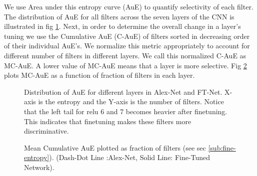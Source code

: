 We use Area under this entropy curve (AuE) to quantify selectivity of each filter. The distribution of AuE for all filters across the seven layers of the CNN is illustrated in fig \ref{fig:fine-hist}. Next, in order to determine the overall change in a layer's tuning we use the Cumulative AuE (C-AuE) of filters sorted in decreasing order of their individual AuE's. We normalize this metric appropriately to account for different number of filters in different layers. We call this normalized C-AuE as MC-AuE. A lower value of MC-AuE means that a layer is more selective.  Fig \ref{fig:fine-entropy} plots MC-AuE as a function of fraction of filters in each layer. 

\begin{figure}[t!]
\centering
{}
\caption{Distribution of AuE for different layers in Alex-Net and FT-Net. X-axis is the entropy and the Y-axis is the number of filters. Notice that the left tail for relu 6 and 7 becomes heavier after finetuning. This indicates that finetuning makes these filters more discriminative.}
\label{fig:fine-hist}
\end{figure}

\begin{figure}[t!]
\centering
{}
\caption{Mean Cumulative AuE plotted as fraction of filters (see sec \ref{sub:fine-entropy}). (Dash-Dot Line :Alex-Net, Solid Line: Fine-Tuned Network).}
\label{fig:fine-entropy}
\end{figure}


